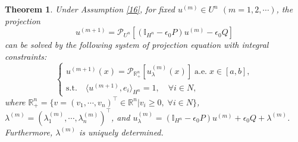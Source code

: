 \documentclass[10pt]{article}
\newtheorem{thm}{Theorem}[section]
\begin{document}
\begin{thm}\label{18}
Under Assumption \ref{16}, for fixed $u^{(m)}\in U^n$ $(m=1,2,\cdots)$, the projection
$$
u^{(m+1)}=\mathcal{P}_{U^n}[(\mathbb{I}_{H^n}-\epsilon_0P){u^{(m)}}-\epsilon_0Q]
$$
 can be solved by the following system of projection equation with integral constraints:
  \begin{equation}\label{26}
   \begin{cases}
u^{(m+1)}(x)=\mathcal{P}_{\mathbb{R}^n_+}[u^{(m)}_{\lambda}(x)]\; \mbox{a.e.} \;x\in[a,b],\\
\mbox{s.t.}\quad \langle u^{(m+1)},e_i\rangle_{H^n}=1,\quad\forall i\in N,
   \end{cases}
 \end{equation}
 where  $\mathbb{R}^n_+=\{v=(v_1,\cdots,v_n)^{\top}\in  \mathbb{R}^n\bigg|v_i\geq0,\;\forall i\in N\}$, $\lambda^{(m)}=(\lambda^{(m)}_1,\cdots,\lambda^{(m)}_n)^{\top}$, and $u^{(m)}_{\lambda}= (\mathbb{I}_{H^n}-\epsilon_0P){u^{(m)}}+\epsilon_0Q+\lambda^{(m)}$.  Furthermore,  $\lambda^{(m)}$ is uniquely determined.
\end{thm}
\end{document}
